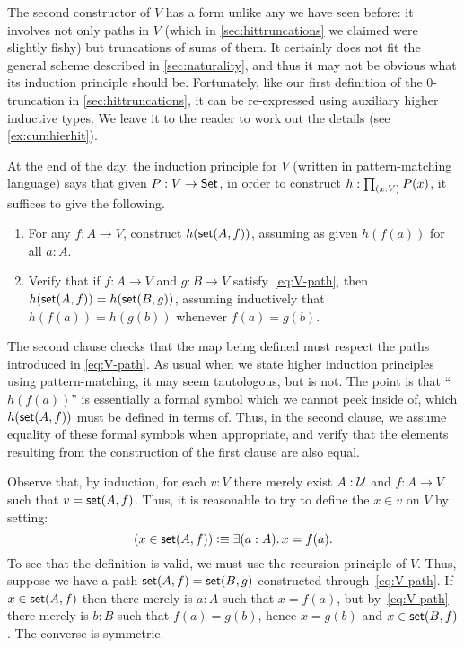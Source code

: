 The second constructor of $V$ has a form unlike any we have seen before: it involves not only paths in $V$ (which in \autoref{sec:hittruncations} we claimed were slightly fishy) but truncations of sums of them.
It certainly does not fit the general scheme described in \autoref{sec:naturality}, and thus it may not be obvious what its induction principle should be.
Fortunately, like our first definition of the 0-truncation in \autoref{sec:hittruncations}, it can be re-expressed using auxiliary higher inductive types.
We leave it to the reader to work out the details (see \autoref{ex:cumhierhit}).

At the end of the day, the induction principle for $V$ (written in pattern-matching language) says that given $P:V\to \mathsf{Set}$, in order to construct $h:\prd{x:V} P(x)$, it suffices to give the following.
\begin{enumerate}
\item For any $f:A\to V$, construct $h(\mathsf{set}(A,f))$, assuming as given $h(f(a))$ for all $a:A$.
\item Verify that if $f : A \to V$ and $g : B \to V$ satisfy~\eqref{eq:V-path}, then $h(\mathsf{set}(A,f)) = h(\mathsf{set}(B,g))$, assuming inductively that $h(f(a)) = h(g(b))$ whenever $f(a)=g(b)$.
\end{enumerate}
The second clause checks that the map being defined must respect the paths introduced in \eqref{eq:V-path}.
As usual when we state higher induction principles using pattern-matching, it may seem tautologous, but is not.
The point is that ``$h(f(a))$'' is essentially a formal symbol which we cannot peek inside of, which $h(\mathsf{set}(A,f))$ must be defined in terms of. Thus, in the second clause, we assume equality of these formal symbols when appropriate, and verify that the elements resulting from the construction of the first clause are also equal.  

Observe that, by induction, for each $v:V$ there merely exist $A:\mathcal{U}$ and $f:A\to V$ such that $v=\mathsf{set}(A,f)$.
Thus, it is reasonable to try to define the  $x\in v$ on $V$ by setting:
%
%
\begin{equation*}
  (x \in \vset(A,f)) \defeq \exis{a : A} x = f(a).
\end{equation*}
%
To see that the definition is valid, we must use the recursion principle of $V$.  Thus, suppose we have a path $\mathsf{set}(A, f) = \mathsf{set}(B, g)$
constructed through~\eqref{eq:V-path}. If $x \in \mathsf{set}(A,f)$ then there merely is $a : A$ such
that $x = f(a)$, but by~\eqref{eq:V-path} there merely is $b : B$ such that $f(a) = g(b)$, hence
$x = g(b)$ and $x \in \mathsf{set}(B,f)$. The converse is symmetric.

